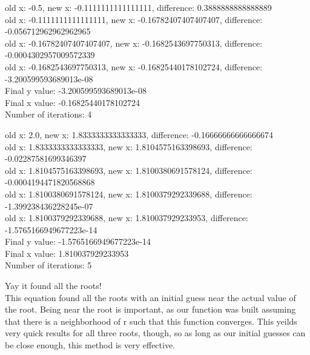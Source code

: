 \documentclass[12pt]{article}
\begin{document}
\begin{enumerate}
\begin{footnotesize}
\begin{spacing}{-.8}
old x: -0.5, new x: -0.1111111111111111, difference: 0.3888888888888889\\
old x: -0.1111111111111111, new x: -0.16782407407407407, difference: -0.056712962962962965\\
old x: -0.16782407407407407, new x: -0.1682543697750313, difference: -0.0004302957009572339\\
old x: -0.1682543697750313, new x: -0.16825440178102724, difference: -3.200599593689013e-08\\
Final y value: -3.200599593689013e-08\\
Final x value: -0.16825440178102724\\
Number of iterations: 4\\
\end{spacing}
\end{footnotesize}
\vspace{.4in}

\begin{footnotesize}
\begin{spacing}{-.8}
old x: 2.0, new x: 1.8333333333333333, difference: -0.16666666666666674\\
old x: 1.8333333333333333, new x: 1.8104575163398693, difference: -0.02287581699346397\\
old x: 1.8104575163398693, new x: 1.8100380691578124, difference: -0.0004194471820568868\\
old x: 1.8100380691578124, new x: 1.8100379292339688, difference: -1.399238436228245e-07\\
old x: 1.8100379292339688, new x: 1.810037929233953, difference: -1.5765166949677223e-14\\
Final y value: -1.5765166949677223e-14\\
Final x value: 1.810037929233953\\
Number of iterations: 5\\
\end{spacing}
\end{footnotesize}
\vspace{.4in}
Yay it found all the roots!\\
This equation found all the roots with an initial guess near the actual value of the root.  Being near the root is important, as our function was built assuming that there is a neighborhood of r such that this function converges.  This yeilds very quick results for all three roots, though, so as long as our initial guesses can be close enough, this method is very effective.


\end{enumerate}
\end{document}
